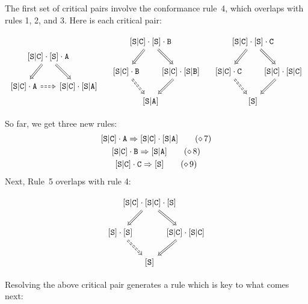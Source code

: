 \documentclass[../generics]{subfiles}
\begin{document}
\begin{example}
The first set of critical pairs involve the conformance rule~4, which overlaps with rules 1, 2, and 3. Here is each critical pair:
\begin{ceqn}
\[
\begin{tikzcd}[column sep=-2em]
& \assocsym{S}{C} \cdot \protosym{S} \cdot \nA
\arrow[ld, Rightarrow]\arrow[rd, Rightarrow] \\
\assocsym{S}{C} \cdot \nA \arrow[rr, Rightarrow, dashed] && \assocsym{S}{C} \cdot \assocsym{S}{A}
\end{tikzcd}
\quad
\begin{tikzcd}[column sep=-2em]
& \assocsym{S}{C} \cdot \protosym{S} \cdot \nB
\arrow[ld, Rightarrow]\arrow[rd, Rightarrow] \\
\assocsym{S}{C} \cdot \nB \arrow[rd, Rightarrow, dashed] && \assocsym{S}{C} \cdot \assocsym{S}{B} \arrow[ld, Rightarrow] \\
& \assocsym{S}{A}
\end{tikzcd}
\quad
\begin{tikzcd}[column sep=-2em]
& \assocsym{S}{C} \cdot \protosym{S} \cdot \nC
\arrow[ld, Rightarrow]\arrow[rd, Rightarrow] \\
\assocsym{S}{C} \cdot \nC \arrow[rd, Rightarrow, dashed] && \assocsym{S}{C} \cdot \assocsym{S}{C} \arrow[ld, Rightarrow] \\
& \protosym{S}
\end{tikzcd}
\]
\end{ceqn}
So far, we get three new rules:
\begin{gather*}
\assocsym{S}{C} \cdot \nA \Red \assocsym{S}{C} \cdot \assocsym{S}{A} \tag{$\CRule{7}$} \\
\assocsym{S}{C} \cdot \nB \Red \assocsym{S}{A} \tag{$\CRule{8}$} \\
\assocsym{S}{C} \cdot \nC \Red \protosym{S} \tag{$\CRule{9}$}
\end{gather*}
Next, Rule~5 overlaps with rule 4:
\begin{ceqn}
\[
\begin{tikzcd}[column sep=-2em]
& \assocsym{S}{C} \cdot \assocsym{S}{C} \cdot \protosym{S}
\arrow[ld, Rightarrow]\arrow[rd, Rightarrow] \\
\protosym{S} \cdot \protosym{S} \arrow[rd, Rightarrow, dashed] && \assocsym{S}{C} \cdot \assocsym{S}{C} \arrow[ld, Rightarrow] \\
& \protosym{S}
\end{tikzcd}
\]
\end{ceqn}
Resolving the above critical pair generates a rule which is key to what comes next:

\end{example}
\end{document}
